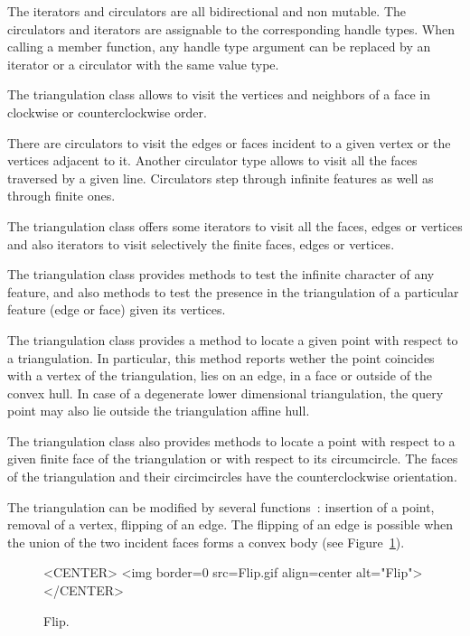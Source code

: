 The iterators and circulators
are all bidirectional and non mutable.
The circulators and iterators are assignable to the 
corresponding handle types. 
When calling a member function,
any handle type argument can be replaced
by an iterator or a circulator
with the same value type.

The triangulation class allows to visit the vertices
and  neighbors of a face in clockwise or counterclockwise order. 

There are circulators  
to visit the edges or faces 
incident to a given vertex or the  vertices 
adjacent to it.
Another circulator type allows to visit all the faces
traversed by a given line.
Circulators step through infinite features as well as 
through finite ones. 

The triangulation class offers 
some iterators to visit all the 
faces, edges or vertices and also iterators to visit 
selectively the finite
faces, edges  or vertices.



The triangulation class provides methods to test
the infinite character of any feature,
and also methods to test the presence in the triangulation
of a particular feature (edge or face) given its vertices.

The triangulation class  provides a method to locate
a given point with respect to a triangulation.
In particular, this method reports wether the point
coincides with a vertex of the triangulation, lies on an edge,
in a face or outside of the convex hull. In case of a degenerate 
lower dimensional triangulation, the query point may also lie
outside the triangulation affine hull.

The triangulation class also provides
methods to locate a point with respect to
a given  finite face of the triangulation or with respect to its
circumcircle.
The faces of the triangulation and their circimcircles 
have the  counterclockwise orientation.

The triangulation can be modified by several functions~:
insertion of a point, removal of a vertex,
flipping  of an edge. The flipping of an edge
is possible when the union of the two incident faces
forms  a convex body (see Figure~\ref{2D_Triangulation_fig_flip_bis}). 

\begin{figure}
\begin{ccTexOnly}
\begin{center} %

\end{center}
\end{ccTexOnly} 
\caption{Flip. \label{2D_Triangulation_fig_flip_bis}}
\begin{ccHtmlOnly}
<CENTER>
<img border=0 src=Flip.gif align=center alt="Flip">
</CENTER>
\end{ccHtmlOnly} 
\end{figure}


